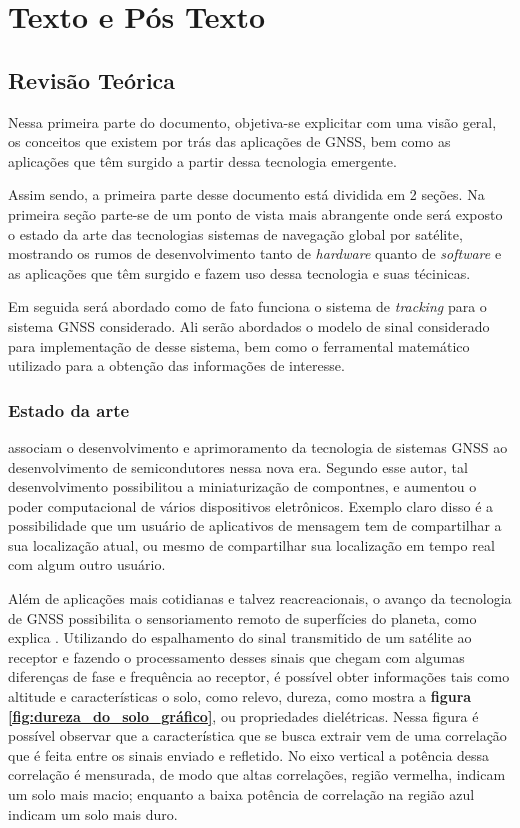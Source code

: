 \part{Texto e Pós Texto}

\chapter[Revisão Teórica]{Revisão Teórica}

Nessa primeira parte do documento, objetiva-se explicitar com uma visão geral, os conceitos que existem por trás das aplicações de GNSS, bem como as aplicações que têm surgido a partir dessa tecnologia emergente.

Assim sendo, a primeira parte desse documento está dividida em 2 seções. Na primeira seção parte-se de um ponto de vista mais abrangente onde será exposto o estado da arte das tecnologias sistemas de navegação global por satélite, mostrando os rumos de desenvolvimento tanto de \textit{hardware} quanto de \textit{software} e as aplicações que têm surgido e fazem uso dessa tecnologia e suas técinicas.

Em seguida será abordado como de fato funciona o sistema de \textit{tracking} para o sistema GNSS considerado. Ali serão abordados o modelo de sinal considerado para implementação de desse sistema, bem como o ferramental matemático utilizado para a obtenção das informações de interesse.

\section{Estado da arte}

\cite{Antreich2022} associam o desenvolvimento e aprimoramento da tecnologia de sistemas GNSS ao desenvolvimento de semicondutores nessa nova era. Segundo esse autor, tal desenvolvimento possibilitou a miniaturização de compontnes, e aumentou o poder computacional de vários dispositivos eletrônicos. Exemplo claro disso é a possibilidade que um usuário de aplicativos de mensagem tem de compartilhar a sua localização atual, ou mesmo de compartilhar sua localização em tempo real com algum outro usuário.

Além de aplicações mais cotidianas e talvez reacreacionais, o avanço da tecnologia de GNSS possibilita o sensoriamento remoto de superfícies do planeta, como explica \cite{Zavorotny2014}. Utilizando do espalhamento do sinal transmitido de um satélite ao receptor e fazendo o processamento desses sinais que chegam com algumas diferenças de fase e frequência ao receptor, é possível obter informações tais como altitude e características o solo, como relevo, dureza, como mostra a \textbf{figura \ref{fig:dureza_do_solo_gráfico}}, ou propriedades dielétricas. Nessa figura é possível observar que a característica que se busca extrair vem de uma correlação que é feita entre os sinais enviado e refletido. No eixo vertical a potência dessa correlação é mensurada, de modo que altas correlações, região vermelha, indicam um solo mais macio; enquanto a baixa potência de correlação na região azul indicam um solo mais duro.

